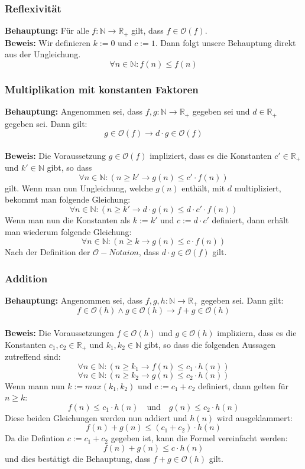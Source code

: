 \documentclass[12px,a4paper]{article}
\begin{document}
	\subsubsection{Reflexivität}
	\textbf{Behauptung:} Für alle $f: \mathbb{N} \rightarrow \mathbb{R}_+$ gilt, dass $f \in \mathcal{O} (f)$. \\
	\textbf{Beweis:} Wir definieren $k:= 0$ und $c:=1$. Dann folgt unsere Behauptung direkt aus der Ungleichung. $$\forall n \in \mathbb{N} : f(n) \leq f(n)$$

\subsubsection{Multiplikation mit konstanten Faktoren}
\textbf{Behauptung:} Angenommen sei, dass $f, g: \mathbb{N} \rightarrow \mathbb{R}_+$ gegeben sei und  $d \in \mathbb{R}_+$ gegeben sei. Dann gilt: $$g \in \mathcal{O} (f) \rightarrow d \cdot g \in \mathcal{O}(f) $$ \\
\textbf{Beweis:} Die Voraussetzung $g \in \mathcal{O} (f)$ impliziert, dass es die Konstanten $c' \in \mathbb{R}_+$ und $k' \in \mathbb{N}$ gibt, so dass $$\forall n \in \mathbb{N} : (n \geq k' \rightarrow g(n) \leq c' \cdot f(n))$$ gilt. Wenn man nun Ungleichung, welche $g(n)$ enthält, mit $d$ multipliziert, bekommt man folgende Gleichung: $$\forall n \in \mathbb{N} : (n \geq k' \rightarrow d \cdot g(n) \leq d \cdot c' \cdot f(n))$$ 
	Wenn man nun die Konstanten als $k:=k'$ und $c:= d \cdot c'$ definiert, dann erhält man wiederum folgende Gleichung: $$\forall n \in \mathbb{N} : (n \geq k \rightarrow g(n) \leq c \cdot f(n))$$ Nach der Definition der $\mathcal{O}-Notaion$, dass $d \cdot g \in \mathcal{O}(f)$ gilt. 

\subsubsection{Addition}
\textbf{Behauptung:}  Angenommen sei, dass $f, g, h: \mathbb{N} \rightarrow \mathbb{R}_+$ gegeben sei. Dann gilt: $$f \in \mathcal{O}(h) \land g \in \mathcal{O}(h) \rightarrow f + g \in \mathcal{O}(h) $$ \\

\textbf{Beweis:} Die Voraussetzungen $f \in \mathcal{O} (h)$ und $g \in \mathcal{O} (h)$ impliziern, dass es die Konstanten $c_1, c_2 \in \mathbb{R}_+$ und $k_1 , k_2 \in \mathbb{N}$ gibt, so dass die folgenden Aussagen zutreffend sind: $$\forall n \in \mathbb{N} : (n \geq k_1 \rightarrow f(n) \leq c_1 \cdot h(n))$$ 
	 $$\forall n \in \mathbb{N} : (n \geq k_2 \rightarrow g(n) \leq c_2 \cdot h(n))$$ 
	 Wenn mann nun $k:= max(k_1,k_2)$ und $c:=c_1 + c_2$ definiert, dann gelten für $n \geq k$:
	 $$f(n) \leq c_1 \cdot h(n) \quad \textrm{und} \quad g(n) \leq c_2 \cdot h(n)$$ 
	 Diese beiden Gleichungen werden nun addiert und $h(n)$ wird ausgeklammert: 
	 $$f(n) + g(n) \leq (c_1 + c_2) \cdot h(n)$$ Da die Defintion $c:= c_1 + c_2$ gegeben ist, kann die Formel vereinfacht werden: 
	 $$f(n) + g(n) \leq c \cdot h(n)$$
	 und dies bestätigt die Behauptung, dass $f + g \in \mathcal{O}(h) $ gilt.\\
\end{document}
